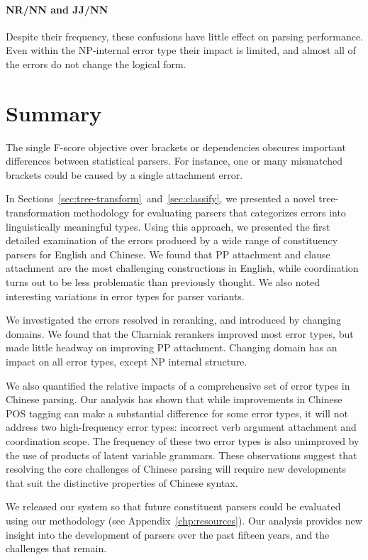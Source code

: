 \paragraph{NR/NN and JJ/NN}  Despite their frequency, these confusions have
little effect on parsing performance.  Even within the NP-internal error type
their impact is limited, and almost all of the errors do not change the
logical form.

\section{Summary}

The single F-score objective over brackets or dependencies obscures important differences between statistical parsers.
For instance, one or many mismatched brackets could be caused by a single attachment error.

In Sections~\ref{sec:tree-transform}~and~\ref{sec:classify}, we presented a novel tree-transformation methodology for
evaluating parsers that categorizes errors into linguistically meaningful
types.  Using this approach, we presented the first detailed examination of the
errors produced by a wide range of constituency parsers for
English and Chinese.  We found that PP attachment and clause attachment are the most
challenging constructions in English, while coordination turns out to be less problematic
than previously thought.  We also noted interesting variations in error types
for parser variants.

We investigated the errors resolved in reranking, and introduced by changing
domains. We found that the Charniak rerankers improved most error types, but
made little headway on improving PP attachment.  Changing domain has an impact
on all error types, except NP internal structure.

We also quantified the relative impacts of a comprehensive set of error types
in Chinese parsing.  Our analysis has shown that while improvements in
Chinese POS tagging can make a substantial difference for some error types,
it will not address two high-frequency error types: incorrect verb argument
attachment and coordination scope.  The frequency of these two error types is
also unimproved by the use of products of latent variable grammars.  These
observations suggest that resolving the core challenges of Chinese parsing
will require new developments that suit the distinctive properties of Chinese
syntax.

We released our system so that future constituent parsers could be evaluated using our methodology (see Appendix~\ref{chp:resources}).
Our analysis provides new insight into the development of parsers over the past fifteen years, and the challenges that remain.

